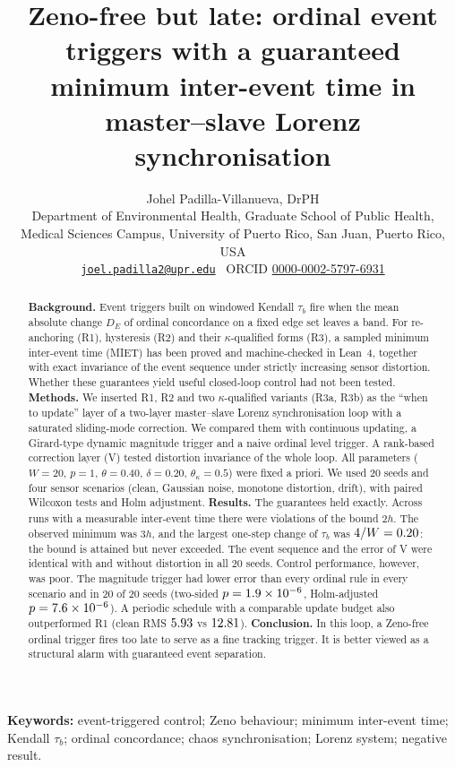 \documentclass[10pt,a4paper]{article}
\title{\vspace{-0.6cm}\textbf{Zeno-free but late: ordinal event triggers with a guaranteed minimum inter-event time in master--slave Lorenz synchronisation}}
\author{Johel Padilla-Villanueva, DrPH\\[3pt]
\small Department of Environmental Health, Graduate School of Public Health,\\
\small Medical Sciences Campus, University of Puerto Rico, San Juan, Puerto Rico, USA\\
\small \href{mailto:joel.padilla2@upr.edu}{\nolinkurl{joel.padilla2@upr.edu}} \textbullet\ ORCID \href{https://orcid.org/0000-0002-5797-6931}{0000-0002-5797-6931}\\[2pt]
\small \doi{10.5281/zenodo.24263807}}
\date{}
\newcommand{\R}[1]{\textup{R#1}}
\begin{document}
\maketitle
\thispagestyle{fancy}

\begin{abstract}
\noindent\textbf{Background.} Event triggers built on windowed Kendall $\tau_b$ fire when the mean absolute change $D_E$ of ordinal concordance on a fixed edge set leaves a band. For re-anchoring (\R{1}), hysteresis (\R{2}) and their $\kappa$-qualified forms (\R{3}), a sampled minimum inter-event time (MIET) has been proved and machine-checked in Lean~4, together with exact invariance of the event sequence under strictly increasing sensor distortion. Whether these guarantees yield useful closed-loop control had not been tested.
\textbf{Methods.} We inserted \R{1}, \R{2} and two $\kappa$-qualified variants (\R{3}a, \R{3}b) as the ``when to update'' layer of a two-layer master--slave Lorenz synchronisation loop with a saturated sliding-mode correction. We compared them with continuous updating, a Girard-type dynamic magnitude trigger and a naive ordinal level trigger. A rank-based correction layer (V) tested distortion invariance of the whole loop. All parameters ($W=20$, $p=1$, $\theta=0.40$, $\delta=0.20$, $\theta_\kappa=0.5$) were fixed a priori. We used 20 seeds and four sensor scenarios (clean, Gaussian noise, monotone distortion, drift), with paired Wilcoxon tests and Holm adjustment.
\textbf{Results.} The guarantees held exactly. Across \nMeasurable{} runs with a measurable inter-event time there were \nViol{} violations of the bound $2h$. The observed minimum was $3h$, and the largest one-step change of $\tau_b$ was $4/W=0.20$: the bound is attained but never exceeded. The event sequence and the error of V were identical with and without distortion in all 20 seeds. Control performance, however, was poor. The magnitude trigger had lower error than every ordinal rule in every scenario and in 20 of 20 seeds (two-sided $p=1.9\times10^{-6}$, Holm-adjusted $p=7.6\times10^{-6}$). A periodic schedule with a comparable update budget also outperformed \R{1} (clean RMS $5.93$ vs $12.81$).
\textbf{Conclusion.} In this loop, a Zeno-free ordinal trigger fires too late to serve as a fine tracking trigger. It is better viewed as a structural alarm with guaranteed event separation.
\end{abstract}

\noindent\textbf{Keywords:} event-triggered control; Zeno behaviour; minimum inter-event time; Kendall $\tau_b$; ordinal concordance; chaos synchronisation; Lorenz system; negative result.
\end{document}

